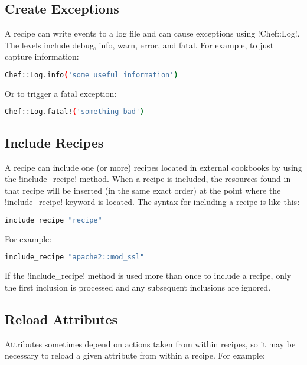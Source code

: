 \subsection{Create Exceptions}

A recipe can write events to a log file and can cause exceptions using \inline!Chef::Log!. The levels include debug, info, warn, error, and fatal. For example, to just capture information:

\begin{lstlisting}[language=Bash,label=lst:cookbook-recipes8]
Chef::Log.info('some useful information')
\end{lstlisting}

Or to trigger a fatal exception:

\begin{lstlisting}[language=Bash,label=lst:cookbook-recipes9]
Chef::Log.fatal!('something bad')
\end{lstlisting}

\subsection{Include Recipes}

A recipe can include one (or more) recipes located in external cookbooks by using the \inline!include_recipe! method. When a recipe is included, the resources found in that recipe will be inserted (in the same exact order) at the point where the \inline!include_recipe! keyword is located. The syntax for including a recipe is like this:

\begin{lstlisting}[language=Bash,label=lst:cookbook-recipes10]
include_recipe "recipe"
\end{lstlisting}

For example:

\begin{lstlisting}[language=Bash,label=lst:cookbook-recipes11]
include_recipe "apache2::mod_ssl"
\end{lstlisting}

If the \inline!include_recipe! method is used more than once to include a recipe, only the first inclusion is processed and any subsequent inclusions are ignored.

\subsection{Reload Attributes}

Attributes sometimes depend on actions taken from within recipes, so it may be necessary to reload a given attribute from within a recipe. For example:

